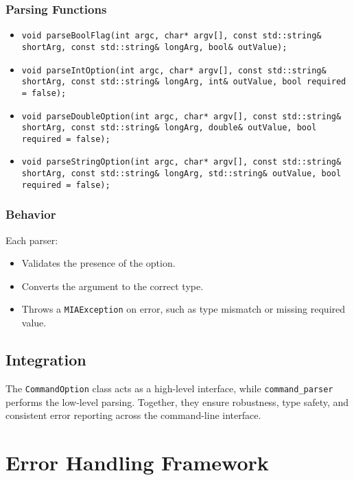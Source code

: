 \subsubsection*{Parsing Functions}
\begin{itemize}
	\item \texttt{void parseBoolFlag(int argc, char* argv[], const std::string\& shortArg, const std::string\& longArg, bool\& outValue);}
	\item \texttt{void parseIntOption(int argc, char* argv[], const std::string\& shortArg, const std::string\& longArg, int\& outValue, bool required = false);}
	\item \texttt{void parseDoubleOption(int argc, char* argv[], const std::string\& shortArg, const std::string\& longArg, double\& outValue, bool required = false);}
	\item \texttt{void parseStringOption(int argc, char* argv[], const std::string\& shortArg, const std::string\& longArg, std::string\& outValue, bool required = false);}
\end{itemize}

\subsubsection*{Behavior}
Each parser:
\begin{itemize}
	\item Validates the presence of the option.
	\item Converts the argument to the correct type.
	\item Throws a \texttt{MIAException} on error, such as type mismatch or missing required value.
\end{itemize}

\subsection{Integration}

The \texttt{CommandOption} class acts as a high-level interface, while \texttt{command\_parser} performs the low-level parsing. Together, they ensure robustness, type safety, and consistent error reporting across the command-line interface.














\section{Error Handling Framework}
\label{sec:error-handling}

